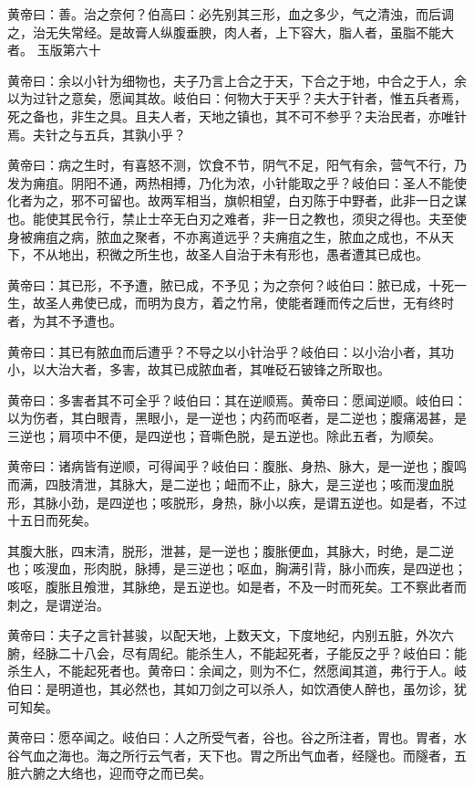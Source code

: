 \documentclass[a4paper,12pt,UTF8,twoside]{ctexbook}
\begin{document}
	黄帝曰：善。治之奈何？伯高曰：必先别其三形，血之多少，气之清浊，而后调之，治无失常经。是故膏人纵腹垂腴，肉人者，上下容大，脂人者，虽脂不能大者。
	玉版第六十
	
	黄帝曰：余以小针为细物也，夫子乃言上合之于天，下合之于地，中合之于人，余以为过针之意矣，愿闻其故。岐伯曰：何物大于天乎？夫大于针者，惟五兵者焉，死之备也，非生之具。且夫人者，天地之镇也，其不可不参乎？夫治民者，亦唯针焉。夫针之与五兵，其孰小乎？
	
	黄帝曰：病之生时，有喜怒不测，饮食不节，阴气不足，阳气有余，营气不行，乃发为痈疽。阴阳不通，两热相搏，乃化为浓，小针能取之乎？岐伯曰：圣人不能使化者为之，邪不可留也。故两军相当，旗帜相望，白刃陈于中野者，此非一日之谋也。能使其民令行，禁止士卒无白刃之难者，非一日之教也，须臾之得也。夫至使身被痈疽之病，脓血之聚者，不亦离道远乎？夫痈疽之生，脓血之成也，不从天下，不从地出，积微之所生也，故圣人自治于未有形也，愚者遭其已成也。
	
	黄帝曰：其已形，不予遭，脓已成，不予见；为之奈何？岐伯曰：脓已成，十死一生，故圣人弗使已成，而明为良方，着之竹帛，使能者踵而传之后世，无有终时者，为其不予遭也。
	
	黄帝曰：其已有脓血而后遭乎？不导之以小针治乎？岐伯曰：以小治小者，其功小，以大治大者，多害，故其已成脓血者，其唯砭石铍锋之所取也。
	
	黄帝曰：多害者其不可全乎？岐伯曰：其在逆顺焉。黄帝曰：愿闻逆顺。岐伯曰：以为伤者，其白眼青，黑眼小，是一逆也；内药而呕者，是二逆也；腹痛渴甚，是三逆也；肩项中不便，是四逆也；音嘶色脱，是五逆也。除此五者，为顺矣。
	
	黄帝曰：诸病皆有逆顺，可得闻乎？岐伯曰：腹胀、身热、脉大，是一逆也；腹鸣而满，四肢清泄，其脉大，是二逆也；衄而不止，脉大，是三逆也；咳而溲血脱形，其脉小劲，是四逆也；咳脱形，身热，脉小以疾，是谓五逆也。如是者，不过十五日而死矣。
	
	其腹大胀，四末清，脱形，泄甚，是一逆也；腹胀便血，其脉大，时绝，是二逆也；咳溲血，形肉脱，脉搏，是三逆也；呕血，胸满引背，脉小而疾，是四逆也；咳呕，腹胀且飧泄，其脉绝，是五逆也。如是者，不及一时而死矣。工不察此者而刺之，是谓逆治。
	
	黄帝曰：夫子之言针甚骏，以配天地，上数天文，下度地纪，内别五脏，外次六腑，经脉二十八会，尽有周纪。能杀生人，不能起死者，子能反之乎？岐伯曰：能杀生人，不能起死者也。黄帝曰：余闻之，则为不仁，然愿闻其道，弗行于人。岐伯曰：是明道也，其必然也，其如刀剑之可以杀人，如饮酒使人醉也，虽勿诊，犹可知矣。
	
	黄帝曰：愿卒闻之。岐伯曰：人之所受气者，谷也。谷之所注者，胃也。胃者，水谷气血之海也。海之所行云气者，天下也。胃之所出气血者，经隧也。而隧者，五脏六腑之大络也，迎而夺之而已矣。
	
\end{document}
